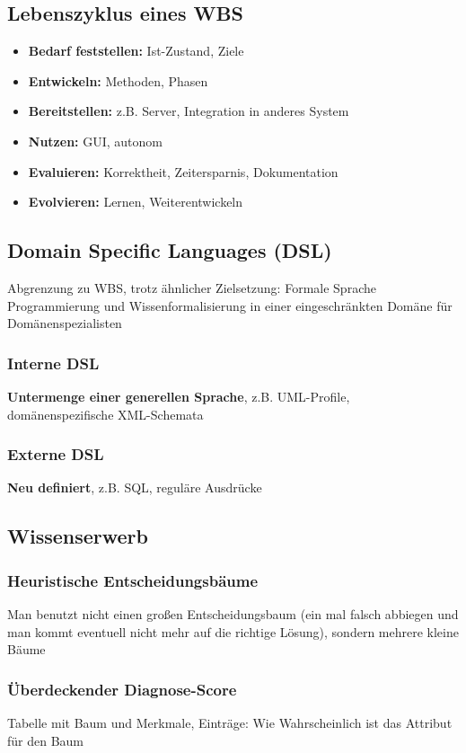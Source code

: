 \documentclass[14pt]{article}
\begin{document}
\subsection{Lebenszyklus eines WBS}
\begin{itemize}
    \item \textbf{Bedarf feststellen:} Ist-Zustand, Ziele
    \item \textbf{Entwickeln:} Methoden, Phasen
    \item \textbf{Bereitstellen:} z.B. Server, Integration in
          anderes System
    \item \textbf{Nutzen:} GUI, autonom
    \item \textbf{Evaluieren:} Korrektheit, Zeitersparnis,
          Dokumentation
    \item \textbf{Evolvieren:} Lernen, Weiterentwickeln
\end{itemize}

\subsection{Domain Specific Languages (DSL)}
Abgrenzung zu WBS, trotz ähnlicher Zielsetzung: Formale Sprache
Programmierung und Wissenformalisierung in einer eingeschränkten
Domäne für Domänenspezialisten \\
\subsubsection{Interne DSL}
\textbf{Untermenge einer generellen Sprache}, z.B. UML-Profile,
domänenspezifische XML-Schemata
\subsubsection{Externe DSL}
\textbf{Neu definiert}, z.B. SQL, reguläre Ausdrücke

\subsection{Wissenserwerb}
\subsubsection{Heuristische Entscheidungsbäume}
Man benutzt nicht einen großen Entscheidungsbaum (ein mal
falsch abbiegen und man kommt eventuell nicht mehr auf
die richtige Lösung), sondern mehrere kleine Bäume
\subsubsection{Überdeckender Diagnose-Score}
Tabelle mit Baum und Merkmale, Einträge: Wie
Wahrscheinlich ist das Attribut für den Baum
\end{document}
